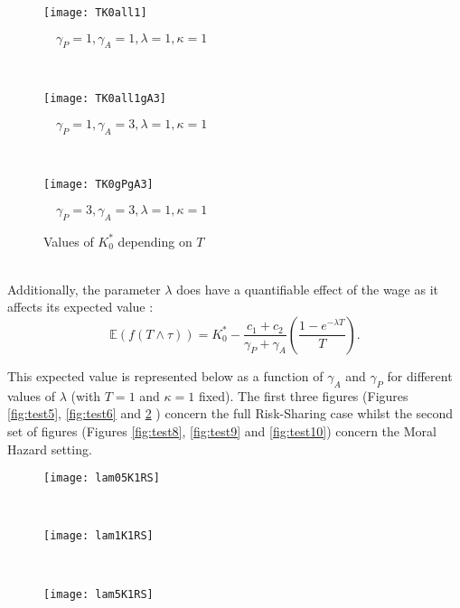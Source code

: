\documentclass[numbook, envcountsect, envcountsame, envcountreset, runningheads, smallextended]{article}
\def \E{\mathbb{E}}
\begin{document}
\begin{figure}[htp]
\caption{Values of $K_0^*$ depending on $T$}
\label{KO5}
\centering
\begin{minipage}{0.31\textwidth}
  \centering
  \texttt{[image: TK0all1]} \par
  \footnotesize{$\quad \gamma_P=1, \gamma_A = 1, \lambda=1, \kappa=1$}
  \label{fig:test1}
\end{minipage}%
~
~
\begin{minipage}{0.31\textwidth}
  \centering
  \texttt{[image: TK0all1gA3]}
   \par
  \footnotesize{$\quad \gamma_P=1, \gamma_A = 3, \lambda=1, \kappa=1$}
\end{minipage}
~
~
\begin{minipage}{0.31\textwidth}
  \centering
  \texttt{[image: TK0gPgA3]}
   \par
  \footnotesize{$\quad \gamma_P=3, \gamma_A = 3, \lambda=1, \kappa=1$}
\end{minipage}

\end{figure}
\ \\






Additionally, the parameter $\lambda$ does have a quantifiable effect of the wage as it affects its expected value : 
$$
\E(f(T\wedge \tau))= K_0^*-\frac{c_1+c_2}{\gamma_P+\gamma_A}\left(\frac{1-e^{-\lambda T}}{T}\right).
$$


This expected value is represented below as a function of $\gamma_A$ and $\gamma_P$ for different values of $\lambda$ (with $T=1$ and $\kappa=1$ fixed). The first three figures (Figures \ref{fig:test5}, \ref{fig:test6} and \ref{fig:test7}  ) concern the full Risk-Sharing case whilst the second set of figures  (Figures \ref{fig:test8}, \ref{fig:test9} and \ref{fig:test10}) concern the Moral Hazard setting.  \\
\begin{figure}[htb!]
\centering

\begin{minipage}{0.31\textwidth}
  \centering
  \texttt{[image: lam05K1RS]}
  \label{fig:test5}
\end{minipage}%
~
~
\begin{minipage}{0.31\textwidth}
  \centering
  \texttt{[image: lam1K1RS]}
  \label{fig:test6}
\end{minipage}%
~
~
\begin{minipage}{0.31\textwidth}
  \centering
  \texttt{[image: lam5K1RS]}
  \label{fig:test7}
\end{minipage}
\end{figure}
\end{document}
